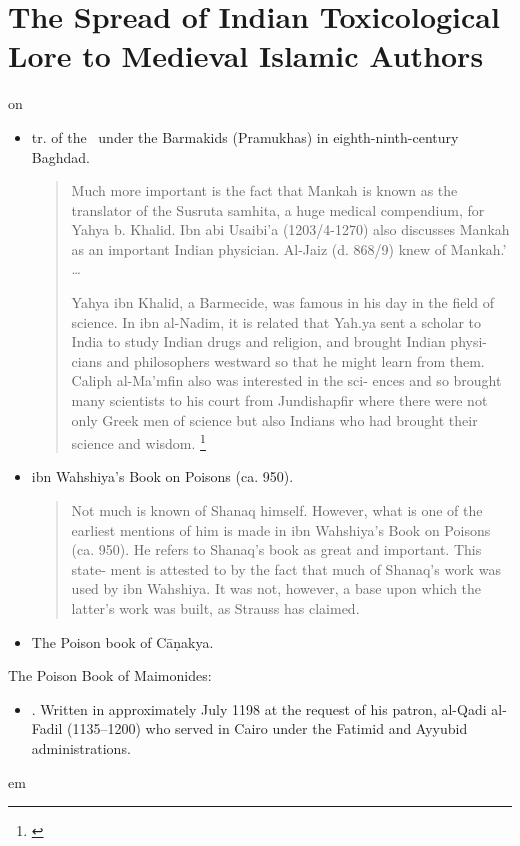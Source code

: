 \section{The Spread of Indian Toxicological Lore to Medieval Islamic 
Authors}

\citet[Introduction]{leve-1966} on 
\begin{itemize}
    \item tr. of the \SS\ under the Barmakids (Pramukhas) in 
    eighth-ninth-century Baghdad.
    \begin{quote}
        Much more important is the fact
        that Mankah is known as the translator of the Susruta
        samhita, a huge medical compendium, for Yahya b.
        Khalid. Ibn abi Usaibi'a (1203/4-1270) also discusses
        Mankah as an important Indian physician. Al-Jaiz
        (d. 868/9) knew of Mankah.'
        \ldots
        
        Yahya ibn Khalid, a Barmecide, was famous in his
        day in the field of science. In ibn al-Nadim, it is
        related that Yah.ya sent a scholar to India to study
        Indian drugs and religion, and brought Indian physi-
        cians and philosophers westward so that he might learn
        from them.
        Caliph al-Ma'mfin  also was interested in the sci-
        ences and so brought many scientists to his court from
        Jundishapfir where there were not only Greek men of
        science but also Indians who had brought their science
        and wisdom.
        \footnote{\cite[6]{leve-1966}}
    \end{quote}
    
    \item ibn Wahshiya's Book on Poisons (ca. 950). 
    \begin{quote}
        Not much is known of Shanaq himself. However,
        what is one of the earliest mentions of him is made in
        ibn Wahshiya's Book on Poisons (ca. 950). He refers
        to Shanaq's book as great and important. This state-
        ment is attested to by the fact that much of Shanaq's
        work was used by ibn Wahshiya. It was not, however,
        a base upon which the latter's work was built, as
        Strauss has claimed.
    \end{quote}
    \item The Poison book of Cāṇakya. 
\end{itemize}

The Poison Book of Maimonides:
\begin{itemize}
    \item {}.  Written in approximately July 1198 
    at the request of his patron, al-Qadi al-Fadil (1135--1200) who 
    served in Cairo under the Fatimid and Ayyubid 
    administrations. 
\end{itemize}em 
